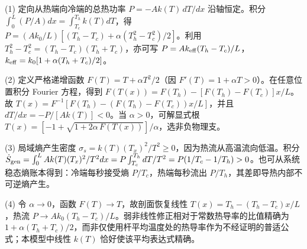 (1) 定向从热端向冷端的总热功率 \(P=-Ak(T)\,dT/dx\) 沿轴恒定。积分 \(\int_0^L(P/A)dx=\int_{T_c}^{T_h}k(T)dT\)，得 \(P=(Ak_0/L)[(T_h-T_c)+\alpha(T_h^2-T_c^2)/2]\)。利用 \(T_h^2-T_c^2=(T_h-T_c)(T_h+T_c)\)，亦可写 \(P=A k_{\rm eff}(T_h-T_c)/L\)，\(k_{\rm eff}=k_0[1+\alpha(T_h+T_c)/2]\)。

(2) 定义严格递增函数 \(F(T)=T+\alpha T^2/2\)（因 \(F'(T)=1+\alpha T>0\)）。在任意位置积分 Fourier 方程，得到 \(F(T(x))=F(T_h)-[F(T_h)-F(T_c)]x/L\)。故 \(T(x)=F^{-1}[F(T_h)-(F(T_h)-F(T_c))x/L]\)，并且 \(dT/dx=-P/[A k(T)]<0\)。当 \(\alpha>0\)，可解显式根 \(T(x)=[-1+\sqrt{1+2\alpha\,F(T(x))}]/\alpha\)，选非负物理支。

(3) 局域熵产生密度 \(\sigma_s=k(T)(T_x)^2/T^2\ge0\)，因为热流从高温流向低温。积分 \(\dot S_{\rm gen}=\int_0^L A k(T)(T_x)^2/T^2dx=P\int_{T_c}^{T_h}dT/T^2=P(1/T_c-1/T_h)>0\)。也可从系统稳态熵账本得到：冷端每秒接受熵 \(P/T_c\)，热端每秒流出 \(P/T_h\)，其差即导热内部不可逆熵产生。

(4) 令 \(\alpha\to0\)，函数 \(F(T)\to T\)，故剖面恢复线性 \(T(x)=T_h-(T_h-T_c)x/L\)，热流 \(P\to A k_0(T_h-T_c)/L\)。弱非线性修正相对于常数热导率的比值精确为 \(1+\alpha(T_h+T_c)/2\)，而非仅使用杆平均温度处的热导率作为不经证明的普适公式；本模型中线性 \(k(T)\) 恰好使该平均表达式精确。
